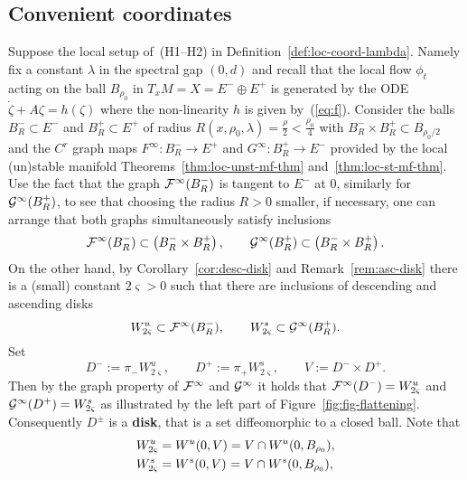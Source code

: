 \documentclass{article}
\begin{document}
\subsection*{Convenient coordinates}%
Suppose the local setup of~(H1--H2) in Definition~\ref{def:loc-coord-lambda}.
Namely fix a constant $\lambda$ in the spectral gap $(0,d)$
and recall that the local flow $\phi_t$ acting on the ball $B_{\rho_0}$
in $T_xM=X=E^-\oplus E^+$ is generated by the ODE
$
     \dot\zeta+A\zeta=h(\zeta)
$
where the non-linearity $h$ is given by~(\ref{eq:f}). 
Consider the balls $B^-_R\subset E^-$ and $B^+_R\subset E^+$
of radius $R(x,\rho_0,\lambda)=\frac{\rho}{2}<\frac{\rho_0}{4}$
with $B^-_R\times B^+_R\subset B_{\rho_0/2}$
and the $C^r$ graph maps $F^\infty:B^-_R\to E^+$ and
$G^\infty:B^+_R\to E^-$ provided by the local (un)stable manifold
Theorems~\ref{thm:loc-unst-mf-thm} and~\ref{thm:loc-st-mf-thm}.
Use the fact that the graph ${\mathcal{F}}^\infty(B^-_R)$ is tangent to $E^-$ at $0$,
similarly for ${\mathcal{G}}^\infty(B^+_R)$, to see that choosing
the radius $R>0$ smaller, if necessary, one can arrange
that both graphs simultaneously satisfy inclusions
$$
     \Ff^\infty(B^-_R)\subset\left(B^-_R\times B^+_R\right),\qquad
     \Gg^\infty(B^+_R)\subset\left(B^-_R\times B^+_R\right). %
$$
On the other hand, by Corollary~\ref{cor:desc-disk} and Remark~\ref{rem:asc-disk}
there is a (small) constant $2\varsigma>0$ such that there are inclusions
of descending and ascending disks
\begin{equation}\label{eq:F-G-inc}
     W^u_{2\varsigma}\subset \Ff^\infty(B^-_R),\qquad 
     W^s_{2\varsigma}\subset \Gg^\infty(B^+_R).
\end{equation}
Set
\begin{equation}\label{eq:new-disks}
     D^-:=\pi_- W^u_{2\varsigma},\qquad D^+:=\pi_+ W^s_{2\varsigma},\qquad V:=D^-\times D^+.
\end{equation}
Then by the graph property of ${\mathcal{F}}^\infty$ and ${\mathcal{G}}^\infty$ it holds that
$     {\mathcal{F}}^\infty(D^-)=W^u_{2\varsigma}
$
and
$
     {\mathcal{G}}^\infty(D^+)=W^s_{2\varsigma}
$
as illustrated by the left part of Figure~\ref{fig:fig-flattening}.
Consequently $D^\pm$ is a {\bf disk}, that is a set diffeomorphic to a
closed ball. Note that
\begin{equation}\label{eq:un-stab-id}
\begin{aligned}
     W^u_{2\varsigma}&=W^u(0,V)=V\cap W^u(0,B_{\rho_0}),
     \\
     W^s_{2\varsigma}&=W^s(0,V)\hspace{.02cm}=V\cap W^s(0,B_{\rho_0}),
\end{aligned}
\end{equation}
\end{document}
